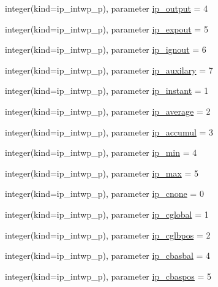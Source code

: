 \begin{DoxyCompactItemize}
\item 
integer(kind=ip\+\_\+intwp\+\_\+p), parameter \hyperlink{namespacemod__oasis__parameters_a556f148d126d8d6dfe711656024436e6}{ip\+\_\+output} = 4
\item 
integer(kind=ip\+\_\+intwp\+\_\+p), parameter \hyperlink{namespacemod__oasis__parameters_ae91d5161b091e1f07e6ee64a38514df6}{ip\+\_\+expout} = 5
\item 
integer(kind=ip\+\_\+intwp\+\_\+p), parameter \hyperlink{namespacemod__oasis__parameters_a4d283e27ebb49e8d97a35842f10d9aec}{ip\+\_\+ignout} = 6
\item 
integer(kind=ip\+\_\+intwp\+\_\+p), parameter \hyperlink{namespacemod__oasis__parameters_a4e90463865a09309212e947e8c8546ac}{ip\+\_\+auxilary} = 7
\item 
integer(kind=ip\+\_\+intwp\+\_\+p), parameter \hyperlink{namespacemod__oasis__parameters_a1028581caadcb9d7506b25c6cd3efd01}{ip\+\_\+instant} = 1
\item 
integer(kind=ip\+\_\+intwp\+\_\+p), parameter \hyperlink{namespacemod__oasis__parameters_a5e40e91da22fca8f2b6a9d4f1c1ace5d}{ip\+\_\+average} = 2
\item 
integer(kind=ip\+\_\+intwp\+\_\+p), parameter \hyperlink{namespacemod__oasis__parameters_adfaf98517b8396e4ba667f2f8bcd0ed5}{ip\+\_\+accumul} = 3
\item 
integer(kind=ip\+\_\+intwp\+\_\+p), parameter \hyperlink{namespacemod__oasis__parameters_a194cfc3b7f2d515492e04fd6e8931c60}{ip\+\_\+min} = 4
\item 
integer(kind=ip\+\_\+intwp\+\_\+p), parameter \hyperlink{namespacemod__oasis__parameters_abe7b7d586b50bd7c7d77c7834efa2801}{ip\+\_\+max} = 5
\item 
integer(kind=ip\+\_\+intwp\+\_\+p), parameter \hyperlink{namespacemod__oasis__parameters_ae043e4e2c2b7f04fec7d8c061ef52934}{ip\+\_\+cnone} = 0
\item 
integer(kind=ip\+\_\+intwp\+\_\+p), parameter \hyperlink{namespacemod__oasis__parameters_ae251e3ac1c9c82ae5db2a768d2d59d5f}{ip\+\_\+cglobal} = 1
\item 
integer(kind=ip\+\_\+intwp\+\_\+p), parameter \hyperlink{namespacemod__oasis__parameters_aec700ad0c6a11dd35e5d6c2afb745fd0}{ip\+\_\+cglbpos} = 2
\item 
integer(kind=ip\+\_\+intwp\+\_\+p), parameter \hyperlink{namespacemod__oasis__parameters_aaa7ead98ff7d53acfd539a32fca9e2c7}{ip\+\_\+cbasbal} = 4
\item 
integer(kind=ip\+\_\+intwp\+\_\+p), parameter \hyperlink{namespacemod__oasis__parameters_a3b96d31bbe142d84df2b93880498936f}{ip\+\_\+cbaspos} = 5

\end{DoxyCompactItemize}

